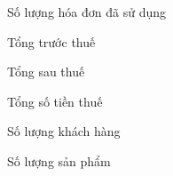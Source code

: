 Số lượng hóa đơn đã sử dụng

Tổng trước thuế

Tổng sau thuế

Tổng số tiền thuế

Số lượng khách hàng

Số lượng sản phẩm











